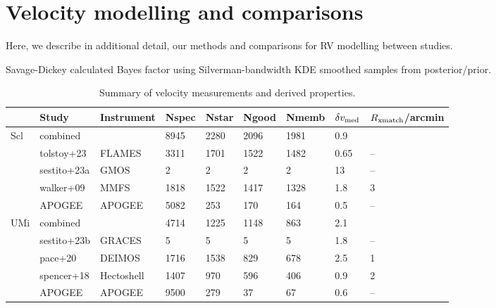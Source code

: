 \section{Velocity modelling and
comparisons}\label{velocity-modelling-and-comparisons}

Here, we describe in additional detail, our methods and comparisons for
RV modelling between studies.

Savage-Dickey calculated Bayes factor using Silverman-bandwidth KDE
smoothed samples from posterior/prior.

\begin{table*}[t]
\centering
\caption{Summary of velocity measurements and derived properties.}
\begin{tabular}{lllllllll}
\toprule
 & Study & Instrument & Nspec & Nstar & Ngood & Nmemb & $\delta v_{\rm med}$ & $R_{\rm xmatch}$/arcmin\\
\midrule
Scl & combined &  & 8945 & 2280 & 2096 & 1981 & 0.9 & \\
 & tolstoy+23 & FLAMES & 3311 & 1701 & 1522 & 1482 & 0.65 & –\\
 & sestito+23a & GMOS & 2 & 2 & 2 & 2 & 13 & –\\
 & walker+09 & MMFS & 1818 & 1522 & 1417 & 1328 & 1.8 & 3\\
 & APOGEE & APOGEE & 5082 & 253 & 170 & 164 & 0.5 & –\\
UMi & combined &  & 4714 & 1225 & 1148 & 863 & 2.1 & \\
 & sestito+23b & GRACES & 5 & 5 & 5 & 5 & 1.8 & –\\
 & pace+20 & DEIMOS & 1716 & 1538 & 829 & 678 & 2.5 & 1\\
 & spencer+18 & Hectoshell & 1407 & 970 & 596 & 406 & 0.9 & 2\\
 & APOGEE & APOGEE & 9500 & 279 & 37 & 67 & 0.6 & –\\
\bottomrule
\end{tabular}
\end{table*}

